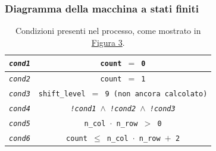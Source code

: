 \documentclass{article}
\begin{document}
\subsubsection{Diagramma della macchina a stati finiti}
\begin{table}[h]
    \centering
    \caption{Condizioni presenti nel processo, come mostrato in \hyperref[fig:fsm]{Figura 3}.}
    \begin{tabular}{||c|c||}
        \hline
        \texttt{\emph{cond1}} & \texttt{count $=$ 0}                                                 \\\hline
        \texttt{\emph{cond2}} & \texttt{count $=$ 1}                                                 \\\hline
        \texttt{\emph{cond3}} & \texttt{shift\_level $=$ 9 (non ancora calcolato)}                   \\\hline
        \texttt{\emph{cond4}} & \texttt{\emph{!cond1} $\wedge$ \emph{!cond2} $\wedge$ \emph{!cond3}} \\\hline
        \texttt{\emph{cond5}} & \texttt{n\_col $\cdot$ n\_row $>$ 0}                                 \\\hline
        \texttt{\emph{cond6}} & \texttt{count $\leq$ n\_col $\cdot$ n\_row $+$ 2}                    \\\hline
    \end{tabular}
\end{table}

\pagebreak
\end{document}
